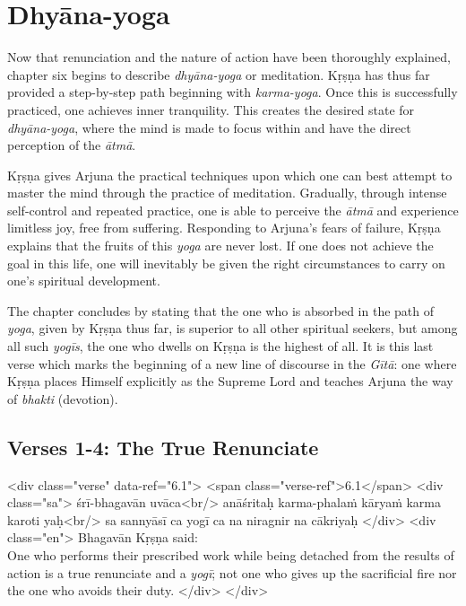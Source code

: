 \chapter{Dhyāna-yoga}\label{chap-dhyana-yoga}

\noindent Now that renunciation and the nature of action have been thoroughly explained, chapter six begins to describe \textit{dhyāna-yoga} or meditation. Kṛṣṇa has thus far provided a step-by-step path beginning with \textit{karma-yoga}. Once this is successfully practiced, one achieves inner tranquility. This creates the desired state for \textit{dhyāna-yoga}, where the mind is made to focus within and have the direct perception of the \textit{ātmā}.

Kṛṣṇa gives Arjuna the practical techniques upon which one can best attempt to master the mind through the practice of meditation. Gradually, through intense self-control and repeated practice, one is able to perceive the \textit{ātmā} and experience limitless joy, free from suffering. Responding to Arjuna’s fears of failure, Kṛṣṇa explains that the fruits of this \textit{yoga} are never lost. If one does not achieve the goal in this life, one will inevitably be given the right circumstances to carry on one’s spiritual development.

The chapter concludes by stating that the one who is absorbed in the path of \textit{yoga}, given by Kṛṣṇa thus far, is superior to all other spiritual seekers, but among all such \textit{yogīs}, the one who dwells on Kṛṣṇa is the highest of all. It is this last verse which marks the beginning of a new line of discourse in the \textit{Gītā}: one where Kṛṣṇa places Himself explicitly as the Supreme Lord and teaches Arjuna the way of \textit{bhakti} (devotion).

\section{Verses 1-4: The True Renunciate}\label{sec-verses-1-4-the-true-renunciate}


\begin{html}
<div class="verse" data-ref="6.1">
  <span class="verse-ref">6.1</span>
  <div class="sa">
    śrī-bhagavān uvāca<br/>
    anāśritaḥ karma-phalaṁ kāryaṁ karma karoti yaḥ<br/>
    sa sannyāsī ca yogī ca na niragnir na cākriyaḥ
  </div>
  <div class="en">
    \hspace*{1em}Bhagavān Kṛṣṇa said: \\ One who performs their prescribed work while being detached from the results of action is a true renunciate and a \textit{yogī}; not one who gives up the sacrificial fire nor the one who avoids their duty.
  </div>
</div>
\end{html}



